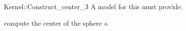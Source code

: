 \begin{ccRefFunctionObjectConcept}{Kernel::Construct_center_3}
A model for this must provide:


 {compute the center of the sphere $s$.}

\end{ccRefFunctionObjectConcept}
